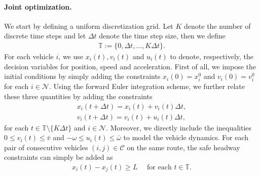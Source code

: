 \documentclass[a4paper]{report}
\theoremstyle{definition}
\theoremstyle{plain}
\begin{document}
\paragraph{Joint optimization.}
We start by defining a uniform discretization grid. Let $K$ denote the number of
discrete time steps and let $\Delta t$ denote the time step size, then we define
\begin{align}
  \mathbb{T} := \{0, \Delta t, \dots, K \Delta t\} .
\end{align}
%
For each vehicle $i$, we use $x_{i}(t), v_{i}(t)$ and $u_{i}(t)$ to denote,
respectively, the decision variables for position, speed and acceleration.
%
First of all, we impose the initial conditions by simply adding the constraints
$x_{i}(0) = x_{i}^{0}$ and $v_{i}(0) = v_{i}^{0}$ for each $i \in \mathcal{N}$.
%
Using the forward Euler integration scheme, we further relate these three
quantities by adding the constraints
\begin{subequations}
\begin{align}
  x_{i}(t + \Delta t) = x_{i}(t) + v_{i}(t) \Delta t , \\
  v_{i}(t + \Delta t) = v_{i}(t) + u_{i}(t) \Delta t ,
\end{align}
\end{subequations}
for each $t \in \mathbb{T} \setminus \{K\Delta t\}$ and $i \in \mathcal{N}$. Moreover, we directly include
the inequalities $0 \leq v_{i}(t) \leq \bar{v}$ and
${-\omega} \leq u_{i}(t) \leq \bar{\omega}$ to model the vehicle dynamics.
%
For each pair of consecutive vehicles $(i, j) \in \mathcal{C}$ on the same route,
the safe headway constraints can simply be added as
\begin{align}
  x_{i}(t) - x_{j}(t) \geq L \quad \text{ for each } t \in \mathbb{T}.
\end{align}
\end{document}
